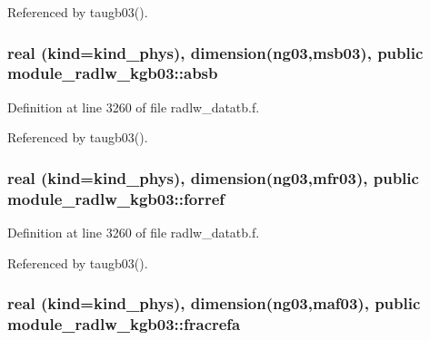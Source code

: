 Referenced by taugb03().

\subsubsection[{\texorpdfstring{absb}{absb}}]{\setlength{\rightskip}{0pt plus 5cm}real (kind=kind\+\_\+phys), dimension(ng03,{\bf msb03}), public module\+\_\+radlw\+\_\+kgb03\+::absb}\hypertarget{namespacemodule__radlw__kgb03_aa84ba66e0a3cc018b03bd13c9c21e133}{}\label{namespacemodule__radlw__kgb03_aa84ba66e0a3cc018b03bd13c9c21e133}


Definition at line 3260 of file radlw\+\_\+datatb.\+f.



Referenced by taugb03().

\subsubsection[{\texorpdfstring{forref}{forref}}]{\setlength{\rightskip}{0pt plus 5cm}real (kind=kind\+\_\+phys), dimension(ng03,{\bf mfr03}), public module\+\_\+radlw\+\_\+kgb03\+::forref}\hypertarget{namespacemodule__radlw__kgb03_afcc55fa81ba6369b56d29db2342c2e6a}{}\label{namespacemodule__radlw__kgb03_afcc55fa81ba6369b56d29db2342c2e6a}


Definition at line 3260 of file radlw\+\_\+datatb.\+f.



Referenced by taugb03().

\subsubsection[{\texorpdfstring{fracrefa}{fracrefa}}]{\setlength{\rightskip}{0pt plus 5cm}real (kind=kind\+\_\+phys), dimension(ng03,{\bf maf03}), public module\+\_\+radlw\+\_\+kgb03\+::fracrefa}\hypertarget{namespacemodule__radlw__kgb03_a26e901a002e789933c5c9b622f3a0932}{}\label{namespacemodule__radlw__kgb03_a26e901a002e789933c5c9b622f3a0932}


